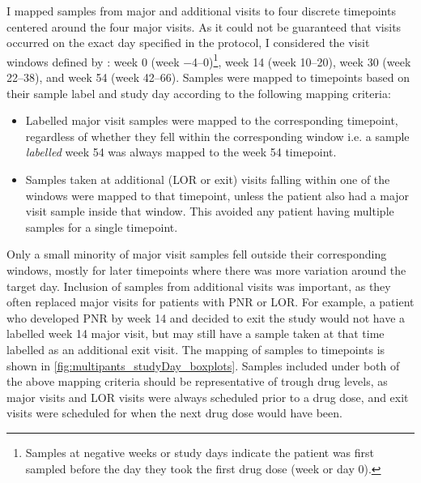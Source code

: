 I mapped samples from major and additional visits to four discrete timepoints centered around the four major visits.
As it could not be guaranteed that visits occurred on the exact day specified in the protocol, I considered the visit windows defined by \textcite{kennedy2019PredictorsAntiTNFTreatment}: week 0 (week \numrange{-4}{0})\footnote{Samples at negative weeks or study days indicate the patient was first sampled before the day they took the first drug dose (week or day 0).}, week 14 (week \numrange{10}{20}), week 30 (week \numrange{22}{38}), and week 54 (week \numrange{42}{66}).
Samples were mapped to timepoints based on their sample label and study day according to the following mapping criteria:
\begin{itemize}
    \item Labelled major visit samples were mapped to the corresponding timepoint, regardless of whether they fell within the corresponding window i.e. a sample \emph{labelled} week 54 was always mapped to the week 54 timepoint.
    \item Samples taken at additional (\gls{LOR} or exit) visits falling within one of the windows were mapped to that timepoint, unless the patient also had a major visit sample inside that window. This avoided any patient having multiple samples for a single timepoint.
\end{itemize}
Only a small minority of major visit samples fell outside their corresponding windows, mostly for later timepoints where there was more variation around the target day.
Inclusion of samples from additional visits was important, as they often replaced major visits for patients with \gls{PNR} or \gls{LOR}.
For example, a patient who developed \gls{PNR} by week 14 and decided to exit the study would not have a labelled week 14 major visit, but may still have a sample taken at that time labelled as an additional exit visit.
The mapping of samples to timepoints is shown in \cref{fig:multipants_studyDay_boxplots}.
Samples included under both of the above mapping criteria should be representative of trough drug levels,
as major visits and \gls{LOR} visits were always scheduled prior to a drug dose,
and exit visits were scheduled for when the next drug dose would have been.

